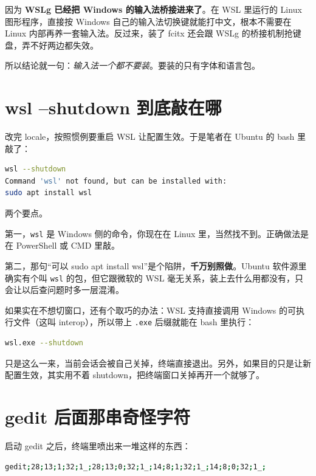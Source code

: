 \documentclass[12pt,a4paper]{ctexbook}
\begin{document}
因为 \textbf{WSLg 已经把 Windows 的输入法桥接进来了}。在 WSL 里运行的 Linux 图形程序，直接按 Windows 自己的输入法切换键就能打中文，根本不需要在 Linux 内部再养一套输入法。反过来，装了 fcitx 还会跟 WSLg 的桥接机制抢键盘，弄不好两边都失效。

所以结论就一句：\emph{输入法一个都不要装}。要装的只有字体和语言包。

\section{wsl --shutdown 到底敲在哪}

改完 locale，按照惯例要重启 WSL 让配置生效。于是笔者在 Ubuntu 的 bash 里敲了：

\begin{lstlisting}[language=bash,title={一个必然失败的尝试}]
wsl --shutdown
Command 'wsl' not found, but can be installed with:
sudo apt install wsl
\end{lstlisting}

两个要点。

第一，\verb|wsl| 是 Windows 侧的命令，你现在在 Linux 里，当然找不到。正确做法是在 PowerShell 或 CMD 里敲。

第二，那句``可以 sudo apt install wsl''是个陷阱，\textbf{千万别照做}。Ubuntu 软件源里确实有个叫 \verb|wsl| 的包，但它跟微软的 WSL 毫无关系，装上去什么用都没有，只会让以后查问题时多一层混淆。

如果实在不想切窗口，还有个取巧的办法：WSL 支持直接调用 Windows 的可执行文件（这叫 interop），所以带上 \verb|.exe| 后缀就能在 bash 里执行：

\begin{lstlisting}[language=bash,title={在 Linux 里调用 Windows 命令}]
wsl.exe --shutdown
\end{lstlisting}

只是这么一来，当前会话会被自己关掉，终端直接退出。另外，如果目的只是让新配置生效，其实用不着 shutdown，把终端窗口关掉再开一个就够了。

\section{gedit 后面那串奇怪字符}

启动 gedit 之后，终端里喷出来一堆这样的东西：

\begin{lstlisting}[language=bash,title={终端里刷出来的一串控制序列}]
gedit;28;13;1;32;1_;28;13;0;32;1_;14;8;1;32;1_;14;8;0;32;1_;
\end{lstlisting}
\end{document}
